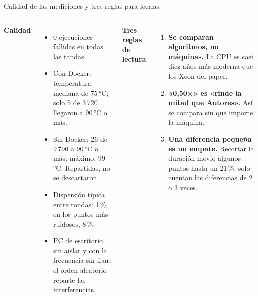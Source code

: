 \begin{frame}{Calidad de las mediciones y tres reglas para leerlas}
  \begin{columns}[T,onlytextwidth]
    \small\textbf{\color{marino}Calidad}\par\vspace{1mm}
    \footnotesize
    \begin{itemize}
      \item 0 ejecuciones fallidas en todas las tandas.
      \item Con Docker: temperatura mediana de 75\,°C; solo 5 de 3\,720 llegaron a 90\,°C o más.
      \item Sin Docker: 26 de 9\,796 a 90\,°C o más; máximo, 99\,°C. Repartidas, no se descartaron.
      \item Dispersión típica entre rondas: 1\,\%; en los puntos más ruidosos, 8\,\%.
      \item PC de escritorio sin aislar y con la frecuencia sin fijar: el orden aleatorio reparte las interferencias.
    \end{itemize}
    \small\textbf{\color{marino}Tres reglas de lectura}\par\vspace{1mm}
    \footnotesize
    \begin{enumerate}
      \item \textbf{Se comparan algoritmos, no máquinas.} La CPU es casi diez años más moderna que los Xeon del paper.
      \item \textbf{«0,50×» es «rinde la mitad que Autores».} Así se compara sin que importe la máquina.
      \item \textbf{Una diferencia pequeña es un empate.} Recortar la duración movió algunos puntos hasta un 21\,\%: solo cuentan las diferencias de 2 o 3 veces.
    \end{enumerate}
  \end{columns}
\end{frame}
